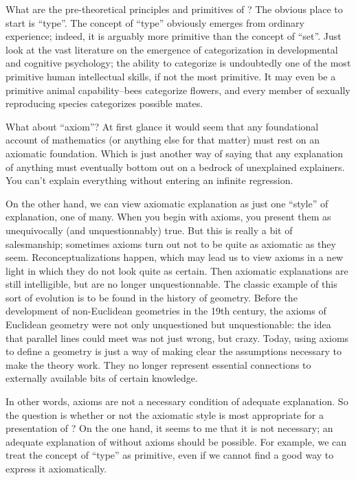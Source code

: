 What are the pre-theoretical principles and primitives of \HoTT{}?  The
obvious place to start is ``type''.  The concept of ``type'' obviously
emerges from ordinary experience; indeed, it is arguably more
primitive than the concept of ``set''.  Just look at the vast
literature on the emergence of categorization in developmental and
cognitive psychology; the ability to categorize is undoubtedly one of
the most primitive human intellectual skills, if not the most
primitive.  It may even be a primitive animal capability--bees
categorize flowers, and every member of sexually reproducing species
categorizes possible mates.

What about ``axiom''?  At first glance it would seem that any
foundational account of mathematics (or anything else for that matter)
must rest on an axiomatic foundation.  Which is just another way of
saying that any explanation of anything must eventually bottom out on
a bedrock of unexplained explainers.  You can't explain everything
without entering an infinite regression.

On the other hand, we can view axiomatic explanation as just one
``style'' of explanation, one of many.  When you begin with axioms,
you present them as unequivocally (and unquestionnably) true.  But
this is really a bit of salesmanship; sometimes axioms turn out not to
be quite as axiomatic as they seem.  Reconceptualizations happen,
which may lead us to view axioms in a new light in which they do not
look quite as certain.  Then axiomatic explanations are still
intelligible, but are no longer unquestionnable.  The classic example
of this sort of evolution is to be found in the history of geometry.
Before the development of non-Euclidean geometries in the 19th
century, the axioms of Euclidean geometry were not only unquestioned
but unquestionable: the idea that parallel lines could
meet was not just wrong, but crazy.  Today, using axioms to define a
geometry is just a way of making clear the assumptions necessary to
make the theory work.  They no longer represent essential
connections to externally available bits of certain knowledge.

In other words, axioms are not a necessary condition of adequate
explanation.  So the question is whether or not the axiomatic style is
most appropriate for a presentation of \HoTT{}?  On the one hand, it
seems to me that it is not necessary; an adequate explanation of \HoTT{}
without axioms should be possible.  For example, we can treat the
concept of ``type'' as primitive, even if we cannot find a good way to
express it axiomatically.

